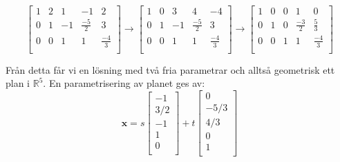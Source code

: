 \documentclass{article}
\begin{document}
$$
\begin{bmatrix}
    1  &  2  &  1  & -1  &  2 \\
    0  &  1  & -1  &  \frac{-5}{2}  & 3 \\
    0  &  0  &  1  &  1  &  \frac{-4}{3} \\
\end{bmatrix} \rightarrow
\begin{bmatrix}
    1  &  0  &  3  & 4  &  -4 \\
    0  &  1  & -1  &  \frac{-5}{2}  & 3 \\
    0  &  0  &  1  &  1  &  \frac{-4}{3} \\
\end{bmatrix} \rightarrow
\begin{bmatrix}
    1  &  0  &  0  &  1  &  0 \\
    0  &  1  &  0  &  \frac{-3}{2}  & \frac{5}{3} \\
    0  &  0  &  1  &  1  &  \frac{-4}{3} \\
\end{bmatrix}
$$

\noindent
Från detta får vi en lösning med två fria parametrar och alltså geometrisk ett 
plan i $\mathbb{R}^5$. En parametrisering av planet ges av:
$$
\mathbf{x} = s
\begin{bmatrix}
    -1 \\
    3/2 \\
    -1 \\
    1 \\
    0 \\
\end{bmatrix}
+ t
\begin{bmatrix}
    0 \\
    -5/3 \\ 
    4/3 \\
    0 \\
    1 \\
\end{bmatrix}
$$
\end{document}

